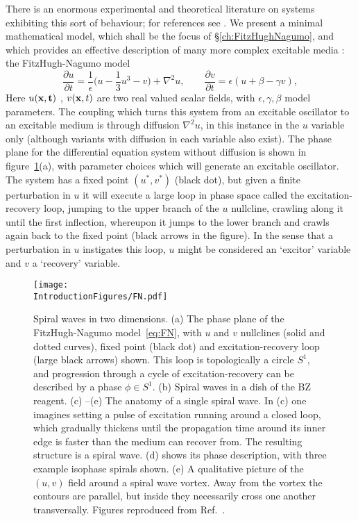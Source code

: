 There is an enormous experimental and theoretical literature on systems exhibiting this sort of behaviour; for references see \citep{WinfreeBook}. We present a minimal mathematical model, which shall be the focus of \S\ref{ch:FitzHughNagumo}, and which provides an effective description of many more complex excitable media \citep{WinfreeBook}: the FitzHugh-Nagumo model \citep{FitzHugh1961,Nagumo1962}
\begin{equation}
\label{eq:FN}
\frac{\partial u}{ \partial t} = \frac{1}{\epsilon}\biggl(u - \frac{1}{3}u^3 -v\biggr) + \nabla^{2} u,\hspace{2em}    \frac{\partial v}{ \partial t} = {\epsilon}(u + \beta -\gamma v) ,
\label{eq:FN}
\end{equation}
Here $u(\bf {x} ,t)$ , $v({\bf x},t)$ are two real valued scalar fields, with $\epsilon,\gamma,\beta$ model parameters. The coupling which turns this system from an excitable oscillator to an excitable medium is through diffusion $\nabla^2 u$, in this instance in the $u$ variable only (although variants with diffusion in each variable also exist). The phase plane for the differential equation system without diffusion is shown in figure~\ref{fig:FN}(a), with parameter choices which will generate an excitable oscillator. The system has a fixed point $(u^*,v^*)$ (black dot), but given a finite perturbation in $u$ it will execute a large loop in phase space called the excitation-recovery loop, jumping to the upper branch of the $u$ nullcline, crawling along it until the first inflection, whereupon it jumps to the lower branch and crawls again back to the fixed point (black arrows in the figure). In the sense that a perturbation in $u$ instigates this loop, $u$ might be considered an `excitor' variable and $v$ a `recovery' variable.
\begin{figure}[htbp]
\centering
\texttt{[image: \\IntroductionFigures/FN.pdf]}
\caption{Spiral waves in two dimensions. (a) The phase plane of the FitzHugh-Nagumo model~\eqref{eq:FN}, with $u$ and $v$ nullclines (solid and dotted curves), fixed point (black dot) and excitation-recovery loop (large black arrows) shown. This loop is topologically a circle $S^1$, and progression through a cycle of excitation-recovery can be described by a phase $\phi \in S^1$. (b) Spiral waves in a dish of the BZ reagent. (c) --(e) The anatomy of a single spiral wave. In (c) one imagines setting a pulse of excitation running around a closed loop, which gradually thickens until the propagation time around its inner edge is faster than the medium can recover from. The resulting structure is a spiral wave. (d) shows its phase description, with three example isophase spirals shown. (e) A qualitative picture of the $(u,v)$ field around a spiral wave vortex. Away from the vortex the contours are parallel, but inside they necessarily cross one another transversally. Figures reproduced from Ref.~\citep{Winfree1983}. }
\label{fig:FN}
\end{figure}

